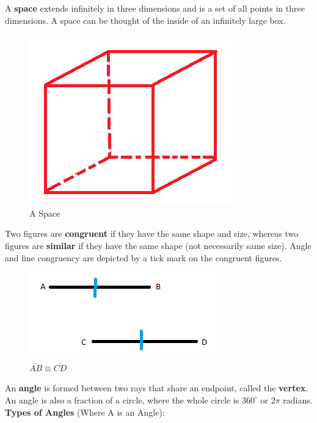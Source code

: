         \noindent A \textbf{space} extends infinitely in three dimensions and is a set of all
        points in three dimensions. A space can be thought of the inside of an infinitely large
        box. \\

        \begin{figure} [hbt!]
            \centering
            \includegraphics[scale = 0.3] {Resources/Unit1Basics/space.PNG}
            \caption*{A Space}
        \end{figure}

        \noindent Two figures are \textbf{congruent} if they have the same shape and size,
        whereas two figures are \textbf{similar} if they have the same shape (not necessarily
        same size). Angle and line congruency are depicted by a tick mark on the congruent
        figures. \\

        \begin{figure} [hbt!]
            \centering
            \includegraphics[scale = 0.75] {Resources/Unit1Basics/congruent.PNG}
            \caption*{$\overline{AB}\equiv\overline{CD}$}
        \end{figure}

        \noindent An \textbf{angle} is formed between two rays that share an endpoint, called
        the \textbf{vertex}. An angle is also a fraction of a circle, where the whole circle is
        $360^\circ$ or $2\pi$ radians. \textbf{Types of Angles} (Where A is an Angle): \\

